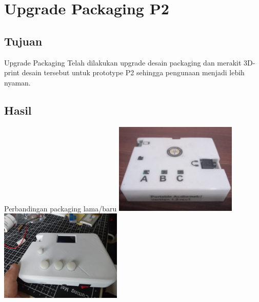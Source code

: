 \documentclass[table,dvipsnames]{beamer}
\begin{document}
	\section{Upgrade Packaging P2}
	
	\begin{frame}
		\subsection{Tujuan}
		\begin{exampleblock}{Upgrade Packaging}
			Telah dilakukan upgrade desain packaging dan merakit 3D-print desain tersebut untuk prototype P2 sehingga pengunaan menjadi lebih nyaman.
		\end{exampleblock}
	
		\subsection{Hasil}
		\begin{exampleblock}{Perbandingan packaging lama/baru}
			\includegraphics[width=165pt]{images/pack_lama}
			\includegraphics[width=165pt]{images/pack_jadi}
		\end{exampleblock}
	\end{frame}
\end{document}
